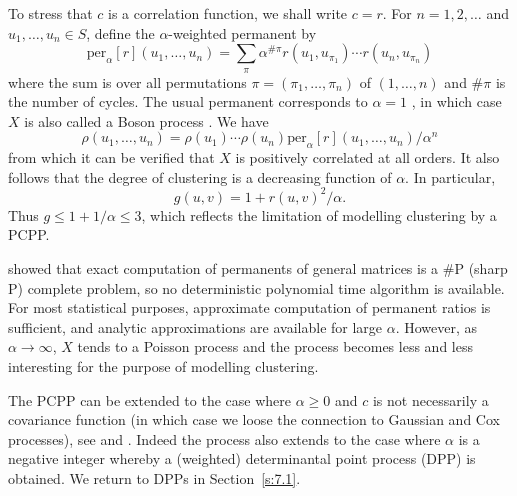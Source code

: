 \documentclass[alpha-refs]{wiley-article}
\begin{document}
To stress that $c$ is a correlation function, we shall write $c=r$. For $n=1,2,\ldots$ and $u_1,\ldots,u_n\in S$, define the $\alpha$-weighted
permanent by
\[{\mathrm{per}}_\alpha[r](u_1,\ldots,u_n)=\sum_{\pi}\alpha^{\#\pi}r(u_1,u_{\pi_1})\cdots r(u_n,u_{\pi_n})
\]
where the sum is over all permutations $\pi=(\pi_1,\ldots,\pi_n)$ of $(1,\ldots,n)$ and $\#\pi$ is the number of cycles. 
The usual permanent corresponds to $\alpha = 1$ \citep{Minc}, in which case $X$ is also called a Boson process \citep{Macchi:75}. We have
\begin{equation*}\label{e:uha}
\rho(u_1,\ldots,u_n)=\rho(u_1)\cdots\rho(u_n)\mathrm{per}_\alpha[r](u_1,\ldots,u_n)/\alpha^n
\end{equation*}
from which it can be verified that 
 $X$ is positively correlated at all orders. It also follows that the degree of clustering is a decreasing function of $\alpha$. In particular,
\begin{equation}\label{e:pairPCPP}
g(u,v)=1+r(u,v)^2/\alpha.
\end{equation}
Thus $g\le 1+1/\alpha\le 3$, which reflects the limitation of modelling clustering by a PCPP.  

\citet{Valiant} showed that exact computation of permanents of general
matrices is a $\#$P (sharp P) complete problem, so no deterministic polynomial time algorithm is available. 
For most statistical purposes, approximate computation of
permanent ratios is sufficient, and analytic approximations are available for large $\alpha$. However, as $\alpha\rightarrow\infty$, $X$ tends to a Poisson process and the process becomes less and less interesting for the purpose of modelling clustering. 

The PCPP can be extended to the case where $\alpha\ge0$ and $c$ is not necessarily a covariance function (in which case we loose the connection to Gaussian and Cox processes), see \citet{MacCM} and \citet{ShiraiTakahashi}. Indeed the process also extends to the case where $\alpha$ is a negative integer whereby a (weighted) determinantal point process (DPP) is obtained. We return to DPPs in Section~\ref{s:7.1}. 
\end{document}
